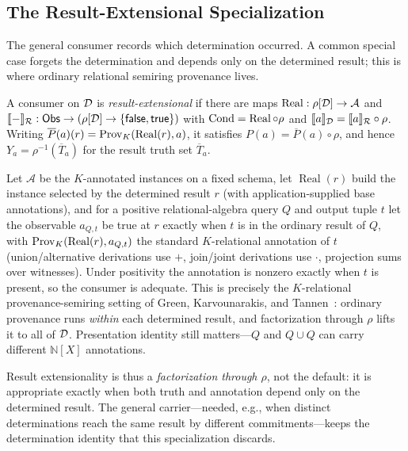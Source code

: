 \subsection{The Result-Extensional Specialization}
\label{sec:result-extensional}

The general consumer records which determination occurred. A common special
case forgets the determination and depends only on the determined result;
this is where ordinary relational semiring provenance lives.

\begin{definition}
  \label{def:result-extensional}
  A consumer on $\mathcal{D}$ is \emph{result-extensional} if there are maps
  $\operatorname{Real} : \rho[\mathcal{D}] \to \mathcal{A}$ and
  $\llbracket - \rrbracket_{\mathcal{R}} : \mathsf{Obs} \to (\rho[\mathcal{D}] \to \{\mathsf{false},\mathsf{true}\})$ with
  $\operatorname{Cond} = \operatorname{Real} \circ \rho$ and
  $\llbracket a \rrbracket_{\mathcal{D}} = \llbracket a \rrbracket_{\mathcal{R}} \circ \rho$. Writing
  $\overline{P}(a)(r) = \operatorname{Prov}_K(\operatorname{Real}(r), a)$, it satisfies
  $P(a) = \overline{P}(a) \circ \rho$, and hence
  $Y_a = \rho^{-1}(\overline{T}_a)$ for the result truth set $\overline{T}_a$.
\end{definition}

\begin{example}
  \label{ex:gkt}
  Let $\mathcal{A}$ be the $K$-annotated instances on a fixed schema, let
  $\operatorname{Real}(r)$ build the instance selected by the determined result
  $r$ (with application-supplied base annotations), and for a positive
  relational-algebra query $Q$ and output tuple $t$ let the observable
  $a_{Q,t}$ be true at $r$ exactly when $t$ is in the ordinary result of $Q$,
  with $\operatorname{Prov}_K(\operatorname{Real}(r), a_{Q,t})$ the standard $K$-relational
  annotation of $t$ (union/alternative derivations use $+$, join/joint
  derivations use $\cdot$, projection sums over witnesses). Under positivity
  the annotation is nonzero exactly when $t$ is present, so the consumer is
  adequate. This is precisely the $K$-relational provenance-semiring setting of
  Green, Karvounarakis, and Tannen~\cite{green2007provenance}: ordinary
  provenance runs \emph{within} each determined result, and factorization
  through $\rho$ lifts it to all of $\mathcal{D}$. Presentation identity still
  matters---$Q$ and $Q \cup Q$ can carry different $\mathbb{N}[X]$
  annotations.
\end{example}

\noindent
Result extensionality is thus a \emph{factorization through $\rho$}, not the
default: it is appropriate exactly when both truth and annotation depend only
on the determined result. The general carrier---needed, e.g., when distinct
determinations reach the same result by different commitments---keeps the
determination identity that this specialization discards.

